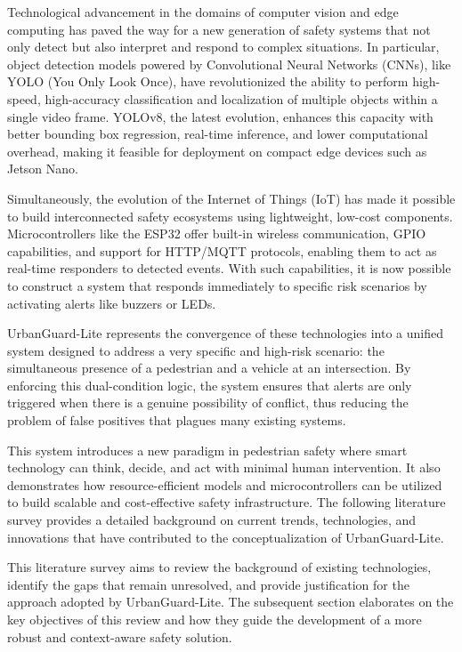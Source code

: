 \documentclass[a4paper, 12pt]{report}
\begin{document}
Technological advancement in the domains of computer vision and edge computing has paved the way for a new generation of safety systems that not only detect but also interpret and respond to complex situations. In particular, object detection models powered by Convolutional Neural Networks (CNNs), like YOLO (You Only Look Once), have revolutionized the ability to perform high-speed, high-accuracy classification and localization of multiple objects within a single video frame. YOLOv8, the latest evolution, enhances this capacity with better bounding box regression, real-time inference, and lower computational overhead, making it feasible for deployment on compact edge devices such as Jetson Nano.

Simultaneously, the evolution of the Internet of Things (IoT) has made it possible to build interconnected safety ecosystems using lightweight, low-cost components. Microcontrollers like the ESP32 offer built-in wireless communication, GPIO capabilities, and support for HTTP/MQTT protocols, enabling them to act as real-time responders to detected events. With such capabilities, it is now possible to construct a system that responds immediately to specific risk scenarios by activating alerts like buzzers or LEDs.

UrbanGuard-Lite represents the convergence of these technologies into a unified system designed to address a very specific and high-risk scenario: the simultaneous presence of a pedestrian and a vehicle at an intersection. By enforcing this dual-condition logic, the system ensures that alerts are only triggered when there is a genuine possibility of conflict, thus reducing the problem of false positives that plagues many existing systems.

This system introduces a new paradigm in pedestrian safety where smart technology can think, decide, and act with minimal human intervention. It also demonstrates how resource-efficient models and microcontrollers can be utilized to build scalable and cost-effective safety infrastructure. The following literature survey provides a detailed background on current trends, technologies, and innovations that have contributed to the conceptualization of UrbanGuard-Lite.

This literature survey aims to review the background of existing technologies, identify the gaps that remain unresolved, and provide justification for the approach adopted by UrbanGuard-Lite. The subsequent section elaborates on the key objectives of this review and how they guide the development of a more robust and context-aware safety solution.
\end{document}

